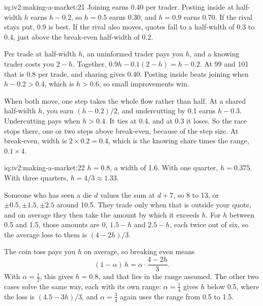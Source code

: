 \begin{solution}{iq:iv2:making-a-market:21}
Joining earns 0.40 per trader. Posting inside at half-width $h$ earns $h - 0.2$, so $h = 0.5$ earns 0.30, and $h = 0.9$ earns 0.70. If the rival stays put, 0.9 is best. If the rival also moves, quotes fall to a half-width of 0.3 to 0.4, just above the break-even half-width of 0.2.

Per trade at half-width $h$, an uninformed trader pays you $h$, and a knowing trader costs you $2 - h$. Together, $0.9h - 0.1(2 - h) = h - 0.2$. At 99 and 101 that is 0.8 per trade, and sharing gives 0.40. Posting inside beats joining when $h - 0.2 > 0.4$, which is $h > 0.6$, so small improvements win.

When both move, one step takes the whole flow rather than half. At a shared half-width $h$, you earn $(h - 0.2)/2$, and undercutting by 0.1 earns $h - 0.3$. Undercutting pays when $h > 0.4$. It ties at 0.4, and at 0.3 it loses. So the race stops there, one or two steps above break-even, because of the step size. At break-even, width is $2 \times 0.2 = 0.4$, which is the knowing share times the range, $0.1 \times 4$.

\end{solution}

\begin{solution}{iq:iv2:making-a-market:22}
$h = 0.8$, a width of 1.6. With one quarter, $h = 0.375$. With three quarters, $h = 4/3 \approx 1.33$.

Someone who has seen a die $d$ values the sum at $d + 7$, so 8 to 13, or $\pm 0.5, \pm 1.5, \pm 2.5$ around 10.5. They trade only when that is outside your quote, and on average they then take the amount by which it exceeds $h$. For $h$ between 0.5 and 1.5, those amounts are 0, $1.5 - h$ and $2.5 - h$, each twice out of six, so the average loss to them is $(4 - 2h)/3$.

The coin toss pays you $h$ on average, so breaking even means
\[
(1 - \alpha)\, h = \alpha \cdot \frac{4 - 2h}{3}.
\]
With $\alpha = \tfrac12$, this gives $h = 0.8$, and that lies in the range assumed. The other two cases solve the same way, each with its own range: $\alpha = \tfrac14$ gives $h$ below 0.5, where the loss is $(4.5 - 3h)/3$, and $\alpha = \tfrac34$ again uses the range from 0.5 to 1.5.

\end{solution}


